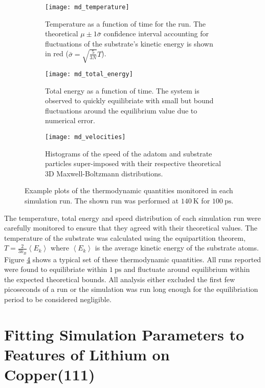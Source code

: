 \begin{figure}
	\centering
	\begin{subfigure}[t]{0.48\textwidth}
		\texttt{[image: md\_temperature]}
		\caption{Temperature as a function of time for the run. The theoretical $\mu \pm 1\bar{\sigma}$ confidence interval accounting for fluctuations of the substrate's kinetic energy is shown in red ($\bar{\sigma}=\sqrt{\frac{5}{3N}}T$).}
		\label{fig:md_temperature}
	\end{subfigure}
	\hfill
	\begin{subfigure}[t]{0.48\textwidth}
		\texttt{[image: md\_total\_energy]}
		\caption{Total energy as a function of time. The system is observed to quickly equilibriate with small but bound fluctuations around the equilibrium value due to numerical error.}
		\label{fig:md_total_energy}
	\end{subfigure}
	\begin{subfigure}[t]{0.9\textwidth}
		\texttt{[image: md\_velocities]}
		\caption{Histograms of the speed of the adatom and substrate particles super-imposed with their respective theoretical 3D Maxwell-Boltzmann distributions.}
		\label{fig:md_velocities}
	\end{subfigure}
	\caption{Example plots of the thermodynamic quantities monitored in each simulation run. The shown run was performed at $\SI{140}{\kelvin}$ for $\SI{100}{\pico\second}$.}
	\label{fig:thermodynamics}
\end{figure}

The temperature, total energy and speed distribution of each simulation run were carefully monitored to ensure that they agreed with their theoretical values. The temperature of the substrate was calculated using the equipartition theorem, $T=\frac{2}{3k_B}\left<E_k\right>$ where $\left<E_k\right>$ is the average kinetic energy of the substrate atoms. Figure \ref{fig:thermodynamics} shows a typical set of these thermodynamic quantities. All runs reported were found to equilibriate within $\SI{1}{\pico\second}$ and fluctuate around equilibrium within the expected theoretical bounds. All analysis either excluded the first few picoseconds of a run or the simulation was run long enough for the equilibriation period to be considered negligible.

\section{Fitting Simulation Parameters to Features of Lithium on Copper(111)} \label{sec:md_fit}

